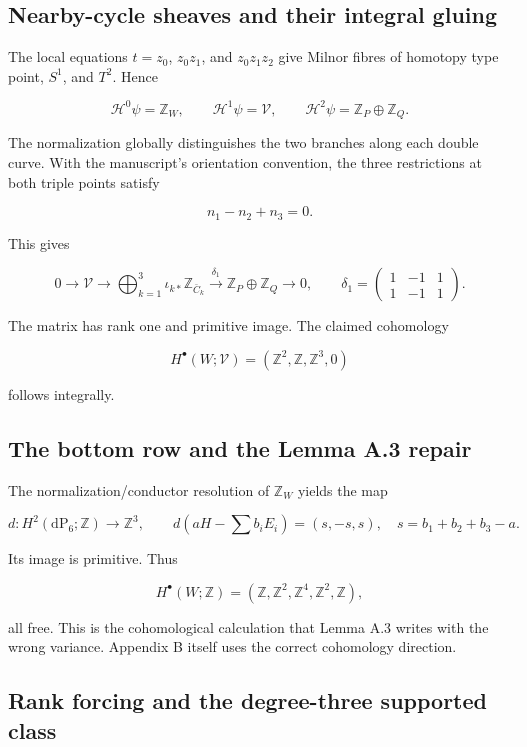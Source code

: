 \documentclass[
  10pt,
  letterpaper,
]{article}
\begin{document}
\subsection{Nearby-cycle sheaves and their integral
gluing}\label{nearby-cycle-sheaves-and-their-integral-gluing}

The local equations \(t=z_0\), \(z_0z_1\), and \(z_0z_1z_2\) give Milnor
fibres of homotopy type point, \(S^1\), and \(T^2\). Hence

\[
\mathcal H^0\psi=\mathbb Z_W,
\qquad
\mathcal H^1\psi=\mathcal V,
\qquad
\mathcal H^2\psi=\mathbb Z_P\oplus\mathbb Z_Q.
\]

The normalization globally distinguishes the two branches along each
double curve. With the manuscript's orientation convention, the three
restrictions at both triple points satisfy

\[
n_1-n_2+n_3=0.
\]

This gives

\[
0\to\mathcal V\to\bigoplus_{k=1}^3\iota_{k*}\mathbb Z_{\bar C_k}
\xrightarrow{\delta_1}\mathbb Z_P\oplus\mathbb Z_Q\to0,
\qquad
\delta_1=
\begin{pmatrix}1&-1&1\\1&-1&1\end{pmatrix}.
\]

The matrix has rank one and primitive image. The claimed cohomology

\[
H^\bullet(W;\mathcal V)=(\mathbb Z^2,\mathbb Z,\mathbb Z^3,0)
\]

follows integrally.

\subsection{The bottom row and the Lemma A.3
repair}\label{the-bottom-row-and-the-lemma-a.3-repair}

The normalization/conductor resolution of \(\mathbb Z_W\) yields the map

\[
d:H^2(\mathrm{dP}_6;\mathbb Z)\to\mathbb Z^3,
\qquad
d(aH-\textstyle\sum b_iE_i)=(s,-s,s),
\quad s=b_1+b_2+b_3-a.
\]

Its image is primitive. Thus

\[
H^\bullet(W;\mathbb Z)=(\mathbb Z,\mathbb Z^2,\mathbb Z^4,\mathbb Z^2,\mathbb Z),
\]

all free. This is the cohomological calculation that Lemma A.3 writes
with the wrong variance. Appendix B itself uses the correct cohomology
direction.

\subsection{Rank forcing and the degree-three supported
class}\label{rank-forcing-and-the-degree-three-supported-class}
\end{document}
